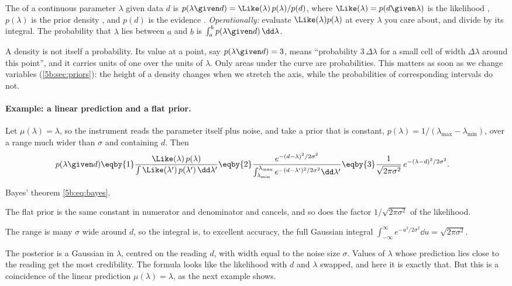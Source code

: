\begin{workdef}
The  of a continuous parameter $\lambda$ given data $d$ is
$p(\lambda\given d)=\Like(\lambda)\,p(\lambda)/p(d)$, where $\Like(\lambda)=p(d\given
\lambda)$ is the likelihood , $p(\lambda)$ is the prior density
, and $p(d)$ is the evidence
. \emph{Operationally:} evaluate $\Like(\lambda)p(\lambda)$ at every
$\lambda$ you care about, and divide by its integral. The probability that $\lambda$
lies between $a$ and $b$ is $\int_a^bp(\lambda\given d)\,\dd\lambda$.
\end{workdef}

A density is not itself a probability. Its value at a point, say $p(\lambda\given d)=
3$, means ``probability $3\,\Delta\lambda$ for a small cell of width $\Delta\lambda$
around this point'', and it carries units of one over the units of $\lambda$. Only areas
under the curve are probabilities. This matters as soon as we change variables
(\cref{5b:sec:priors}): the height of a density changes when we stretch the axis,
while the probabilities of corresponding intervals do not.

\paragraph{Example: a linear prediction and a flat prior.}
Let $\mu(\lambda)=\lambda$, so the instrument reads the parameter itself plus noise,
and take a prior that is constant, $p(\lambda)=1/(\lambda_{\max}-\lambda_{\min})$, over
a range much wider than $\sigma$ and containing $d$. Then
\begin{align*}
  p(\lambda\given d)
  &\eqby{1}\frac{\Like(\lambda)\,p(\lambda)}{\int\Like(\lambda')\,p(\lambda')\,\dd\lambda'}
   \eqby{2}\frac{e^{-(d-\lambda)^2/2\sigma^2}}{\int_{\lambda_{\min}}^{\lambda_{\max}}
       e^{-(d-\lambda')^2/2\sigma^2}\dd\lambda'}
   \eqby{3}\frac{1}{\sqrt{2\pi\sigma^2}}\,e^{-(\lambda-d)^2/2\sigma^2}.
\end{align*}
\begin{explain}
  \item Bayes' theorem \eqref{5b:eq:bayes}.
  \item The flat prior is the same constant in numerator and denominator and cancels,
        and so does the factor $1/\sqrt{2\pi\sigma^2}$ of the likelihood.
  \item The range is many $\sigma$ wide around $d$, so the integral is, to excellent
        accuracy, the full Gaussian integral $\int_{-\infty}^\infty e^{-u^2/2\sigma^2}
        \dd u=\sqrt{2\pi\sigma^2}$.
\end{explain}
The posterior is a Gaussian in $\lambda$, centred on the reading $d$, with width equal
to the noise size $\sigma$. Values of $\lambda$ whose prediction lies close to the
reading get the most credibility. The formula looks like the likelihood with $d$ and
$\lambda$ swapped, and here it is exactly that. But this is a coincidence of the linear
prediction $\mu(\lambda)=\lambda$, as the next example shows.


